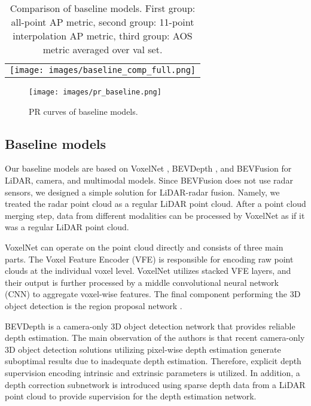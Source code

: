 \documentclass{article}
\begin{document}
\begin{table}[t]
  \centering  
  \begin{tabular}{c}       
    \texttt{[image: images/baseline\_comp\_full.png]}
  \end{tabular}
  \caption{Comparison of baseline models. First group: all-point AP metric, second group: 11-point interpolation AP metric, third group: AOS metric averaged over val set. }
  \label{tab:metrics}
\end{table}

\begin{figure}[t]
  \centering
   \texttt{[image: images/pr\_baseline.png]}
   \caption{PR curves of baseline models.}
   \label{fig:pr-curves}
\end{figure}


\subsection{Baseline models}
Our baseline models are based on VoxelNet \citep{zhou2018voxelnet}, BEVDepth \citep{li2022bevdepth}, and BEVFusion \citep{liu2022bevfusion} for LiDAR, camera, and multimodal models. Since BEVFusion does not use radar sensors, we designed a simple solution for LiDAR-radar fusion. Namely, we treated the radar point cloud as a regular LiDAR point cloud. After a point cloud merging step, data from different modalities can be processed by VoxelNet as if it was a regular LiDAR point cloud.

VoxelNet can operate on the point cloud directly and consists of three main parts. The Voxel Feature Encoder (VFE) is responsible for encoding raw point clouds at the individual voxel level. VoxelNet utilizes stacked VFE layers, and their output is further processed by a middle convolutional neural network (CNN) to aggregate voxel-wise features. The final component performing the 3D object detection is the region proposal network \citep{ren2015faster}.

BEVDepth is a camera-only 3D object detection network that provides reliable depth estimation. The main observation of the authors is that recent camera-only 3D object detection solutions utilizing pixel-wise depth estimation generate suboptimal results due to inadequate depth estimation. Therefore, explicit depth supervision encoding intrinsic and extrinsic parameters is utilized. In addition, a depth correction subnetwork is introduced using sparse depth data from a LiDAR point cloud to provide supervision for the depth estimation network.
\end{document}
